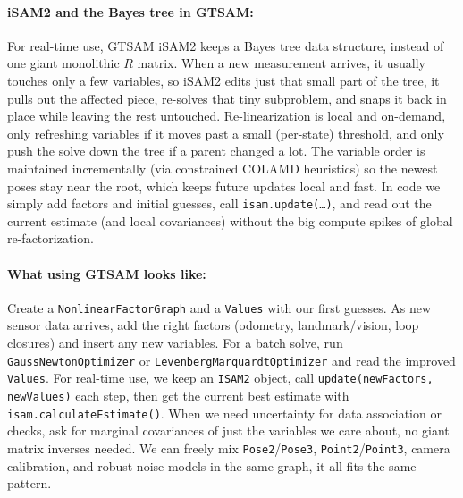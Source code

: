 \paragraph{iSAM2 and the Bayes tree in GTSAM:}
For real-time use, \gls{GTSAM} \gls{iSAM}2 keeps a Bayes tree data structure, instead of one giant monolithic $R$ matrix. When a new measurement arrives, it usually touches only a few variables, so \gls{iSAM}2 edits just that small part of the tree, it pulls out the affected piece, re-solves that tiny subproblem, and snaps it back in place while leaving the rest untouched. Re-linearization is local and on-demand, only refreshing variables if it moves past a small (per-state) threshold, and only push the solve down the tree if a parent changed a lot. The variable order is maintained incrementally (via constrained COLAMD heuristics) so the newest poses stay near the root, which keeps future updates local and fast. In code we simply add factors and initial guesses, call \texttt{isam.update(\dots)}, and read out the current estimate (and local covariances) without the big compute spikes of global re-factorization. \cite{GTSAM_handbook}

\paragraph{What using GTSAM looks like:}
Create a \texttt{NonlinearFactorGraph} and a \texttt{Values} with our first guesses. As new sensor data arrives, add the right factors (odometry, landmark/vision, loop closures) and insert any new variables. For a batch solve, run \texttt{GaussNewtonOptimizer} or \texttt{LevenbergMarquardtOptimizer} and read the improved \texttt{Values}. For real-time use, we keep an \texttt{ISAM2} object, call \texttt{update(newFactors, newValues)} each step, then get the current best estimate with \texttt{isam.calculateEstimate()}. When we need uncertainty for data association or checks, ask for marginal covariances of just the variables we care about, no giant matrix inverses needed. We can freely mix \texttt{Pose2}/\texttt{Pose3}, \texttt{Point2}/\texttt{Point3}, camera calibration, and robust noise models in the same graph, it all fits the same pattern. \cite{GTSAM_handbook}

